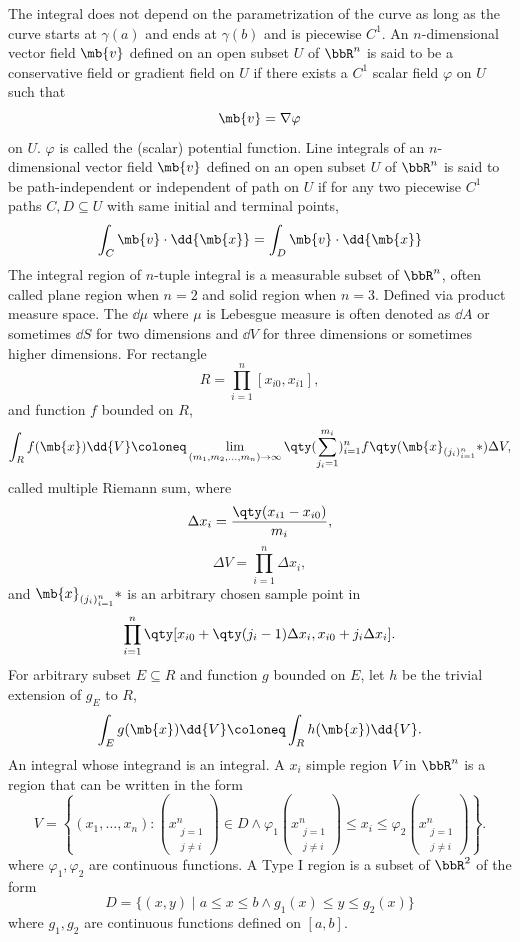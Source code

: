 The integral does not depend on the parametrization of the curve as long as the curve starts at $\gamma(a)$ and ends at $\gamma(b)$ and is piecewise $C^1$.
An $n$-dimensional vector field $\mb{v}$ defined on an open subset $U$ of $\bbR^n$ is said to be a conservative field or gradient field on $U$ if there exists a $C^1$ scalar field $\varphi$ on $U$ such that
\[\mb{v}=\nabla\varphi\]
on $U$. $\varphi$ is called the (scalar) potential function.
Line integrals of an $n$-dimensional vector field $\mb{v}$ defined on an open subset $U$ of $\bbR^n$ is said to be path-independent or independent of path on $U$ if for any two piecewise $C^1$ paths $C,D\subseteq U$ with same initial and terminal points,
\[\int_C\mb{v}\cdot\dd{\mb{x}}=\int_D\mb{v}\cdot\dd{\mb{x}}\]
The integral region of $n$-tuple integral is a measurable subset of $\bbR^n$, often called plane region when $n=2$ and solid region when $n=3$.
Defined via product measure space. The $\dd{\mu}$ where $\mu$ is Lebesgue measure is often denoted as $\dd{A}$ or sometimes $\dd{S}$ for two dimensions and $\dd{V}$ for three dimensions or sometimes higher dimensions.
For rectangle
\[R=\prod_{i=1}^n[x_{i0},x_{i1}],\]
and function $f$ bounded on $R$,
\[\int_Rf(\mb{x})\dd{V}\coloneq\lim_{(m_1,m_2,\ldots,m_n)\to\infty}\qty(\sum_{j_i=1}^{m_i})_{i=1}^nf\qty(\mb{x}_{(j_i)_{i=1}^n}*)\Delta V,\]
called multiple Riemann sum, where
\[\Delta x_i=\frac{\qty(x_{i1}-x_{i0})}{m_i},\]
\[\Delta V=\prod_{i=1}^n\Delta x_i,\]
and $\mb{x}_{(j_i)_{i=1}^n}*$ is an arbitrary chosen sample point in
\[\prod_{i=1}^n\qty[x_{i0}+\qty(j_i-1)\Delta x_i,x_{i0}+j_i\Delta x_i].\]
For arbitrary subset $E\subseteq R$ and function $g$ bounded on $E$, let $h$ be the trivial extension of $g_E$ to $R$,
\[\int_Eg(\mb{x})\dd{V}\coloneq\int_Rh(\mb{x})\dd{V}.\]
An integral whose integrand is an integral.
A $x_i$ simple region $V$ in $\bbR^n$ is a region that can be written in the form
\[V=\left\{(x_1,\ldots,x_n)\colon (x_{\substack{j=1\\j\neq i}}^n)\in D\land\varphi_1(x_{\substack{j=1\\j\neq i}}^n)\le x_i\le\varphi_2(x_{\substack{j=1\\j\neq i}}^n)\right\}.\]
where $\varphi_1,\varphi_2$ are continuous functions.
A Type I region is a subset of $\bbR^2$ of the form
\[D=\{(x,y)\mid a\le x\le b\land g_1(x)\le y\le g_2(x)\}\]
where $g_1,g_2$ are continuous functions defined on $[a,b]$.


